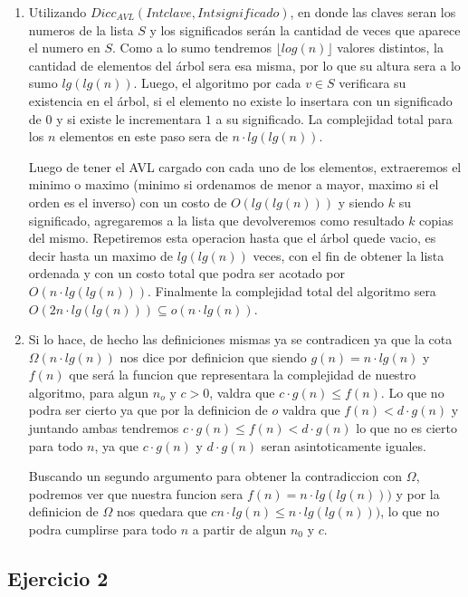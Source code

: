 \documentclass[10pt, a4paper]{report}
\begin{document}
\begin{enumerate}
 \item Utilizando $Dicc_{AVL}(Int clave, Int significado)$, en donde las claves seran los numeros de la lista $S$ y los significados ser\'an la cantidad de veces que aparece el numero en $S$. Como a lo sumo tendremos $\lfloor log(n) \rfloor$ valores distintos, la cantidad de elementos del \'arbol sera esa misma, por lo que su altura sera a lo sumo $lg(lg(n))$. Luego, el algoritmo por cada $v \in S$ verificara su existencia en el \'arbol, si el elemento no existe lo insertara con un significado de $0$ y si existe le incrementara $1$ a su significado. La complejidad total para los $n$ elementos en este paso sera de $n \cdot lg(lg(n))$. 
 
 Luego de tener el AVL cargado con cada uno de los elementos, extraeremos el minimo o maximo (minimo si ordenamos de menor a mayor, maximo si el orden es el inverso) con un costo de $O(lg(lg(n)))$ y siendo $k$ su significado, agregaremos a la lista que devolveremos como resultado $k$ copias del mismo. Repetiremos esta operacion hasta que el \'arbol quede vacio, es decir hasta un maximo de $lg(lg(n))$ veces, con el fin de obtener la lista ordenada y con un costo total que podra ser acotado por $O(n \cdot lg(lg(n)))$. Finalmente la complejidad total del algoritmo sera $O(2n \cdot lg(lg(n))) \subseteq o(n\cdot lg(n))$.
 
 \item Si lo hace, de hecho las definiciones mismas ya se contradicen ya que la cota $\Omega(n\cdot lg(n))$ nos dice por definicion que siendo $g(n) = n\cdot lg(n)$ y $f(n)$ que ser\'a la funcion que representara la complejidad de nuestro algoritmo, para algun $n_o$ y $c>0$, valdra que $c\cdot g(n) \leq f(n)$. Lo que no podra ser cierto ya que por la definicion de $o$ valdra que $f(n) < d\cdot g(n)$ y juntando ambas tendremos $c\cdot g(n) \leq f(n) < d\cdot g(n)$ lo que no es cierto para todo $n$, ya que $c\cdot g(n)$ y $d\cdot g(n)$ seran asintoticamente iguales.
 
 Buscando un segundo argumento para obtener la contradiccion con $\Omega$, podremos ver que nuestra funcion sera $f(n) = n \cdot lg(lg(n)))$ y por la definicion de $\Omega$ nos quedara que $cn\cdot lg(n) \leq n \cdot lg(lg(n)))$, lo que no podra cumplirse para todo $n$ a partir de algun $n_0$ y $c$.
 
 
\end{enumerate}


\subsection*{Ejercicio 2}
\end{document}
